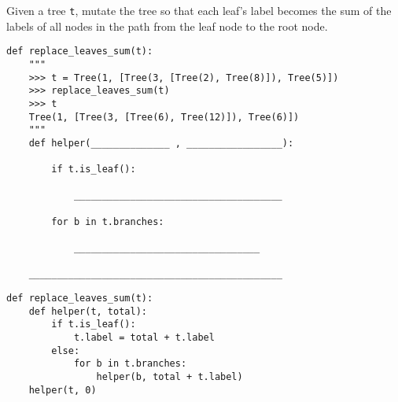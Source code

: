 \begin{blocksection}
\question Given a tree \texttt{t}, mutate the tree so that each leaf's label becomes the sum of the labels of all nodes in the path from the leaf node to the root node. 
\end{blocksection}

\begin{lstlisting}
def replace_leaves_sum(t):
    """
    >>> t = Tree(1, [Tree(3, [Tree(2), Tree(8)]), Tree(5)])
    >>> replace_leaves_sum(t)
    >>> t
    Tree(1, [Tree(3, [Tree(6), Tree(12)]), Tree(6)])
    """
    def helper(______________ , _________________):

        if t.is_leaf():

            _____________________________________

        for b in t.branches:

            _________________________________

    _____________________________________________
\end{lstlisting}

\begin{solution}
\begin{lstlisting}
def replace_leaves_sum(t):
    def helper(t, total):
        if t.is_leaf():
            t.label = total + t.label
        else:
            for b in t.branches:
                helper(b, total + t.label)
    helper(t, 0)
\end{lstlisting}
\end{solution}
